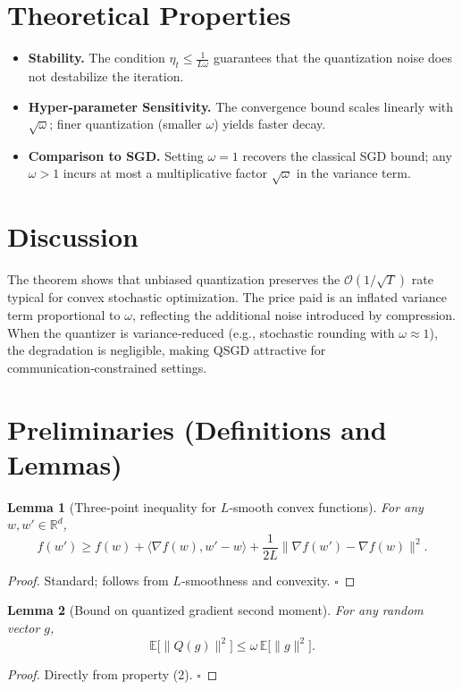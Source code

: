 \documentclass[11pt]{article}
\newtheorem{lemma}{Lemma}
\newcommand{\E}{\mathbb{E}}
\newcommand{\R}{\mathbb{R}}
\begin{document}
\section*{Theoretical Properties}
\begin{itemize}[leftmargin=*]
\item \textbf{Stability.} The condition $\eta_{t}\le \frac{1}{L\omega}$ guarantees that the quantization noise does not destabilize the iteration.
\item \textbf{Hyper‑parameter Sensitivity.} The convergence bound scales linearly with $\sqrt{\omega}$; finer quantization (smaller $\omega$) yields faster decay.
\item \textbf{Comparison to SGD.} Setting $\omega=1$ recovers the classical SGD bound; any $\omega>1$ incurs at most a multiplicative factor $\sqrt{\omega}$ in the variance term.
\end{itemize}

\section*{Discussion}
The theorem shows that unbiased quantization preserves the $\mathcal{O}(1/\sqrt{T})$ rate typical for convex stochastic optimization. The price paid is an inflated variance term proportional to $\omega$, reflecting the additional noise introduced by compression. When the quantizer is variance‑reduced (e.g., stochastic rounding with $\omega\approx1$), the degradation is negligible, making QSGD attractive for communication‑constrained settings.

\newpage

\section*{Preliminaries (Definitions and Lemmas)}
\begin{lemma}[Three‑point inequality for $L$‑smooth convex functions]\label{lem:three}
For any $w,w'\in\R^{d}$,
\[
f(w')\ge f(w)+\langle\nabla f(w),w'-w\rangle+\frac{1}{2L}\|\nabla f(w')-\nabla f(w)\|^{2}.
\]
\end{lemma}
\begin{proof}
Standard; follows from $L$‑smoothness and convexity. \hfill $\square$
\end{proof}

\begin{lemma}[Bound on quantized gradient second moment]\label{lem:quant}
For any random vector $g$,
\[
\E\big[\|Q(g)\|^{2}\big]\le \omega\,\E\big[\|g\|^{2}\big].
\]
\end{lemma}
\begin{proof}
Directly from property (2). \hfill $\square$
\end{proof}
\end{document}
